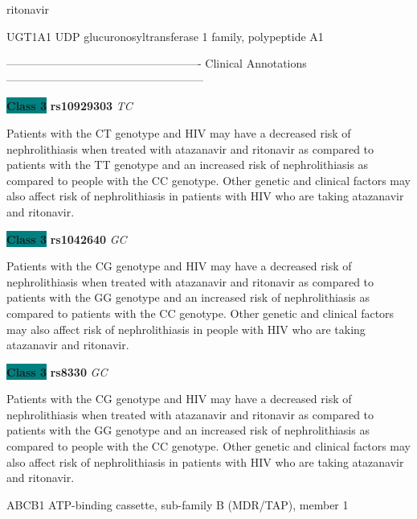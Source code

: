 \documentclass{resume} %
\begin{document}
\begin{rSection}{ ritonavir }
\begin{rSubsection}{ UGT1A1 }{ UDP glucuronosyltransferase 1 family, polypeptide A1 }{}{}
\item[] ---------------------------------------------------- Clinical Annotations -----------------------------------------------------\newline
\item \textbf{\colorbox{teal} {Class 3}} \textbf{ rs10929303 } \textit{ TC }
\item[] Patients with the CT genotype and HIV may have a decreased risk of nephrolithiasis when treated with atazanavir and ritonavir as compared to patients with the TT genotype and an increased risk of nephrolithiasis as compared to people with the CC genotype. Other genetic and clinical factors may also affect risk of nephrolithiasis in patients with HIV who are taking atazanavir and ritonavir. \item \textbf{\colorbox{teal} {Class 3}} \textbf{ rs1042640 } \textit{ GC }
\item[] Patients with the CG genotype and HIV may have a decreased risk of nephrolithiasis when treated with atazanavir and ritonavir as compared to patients with the GG genotype and an increased risk of nephrolithiasis as compared to patients with the CC genotype. Other genetic and clinical factors may also affect risk of nephrolithiasis in people with HIV who are taking atazanavir and ritonavir.\item \textbf{\colorbox{teal} {Class 3}} \textbf{ rs8330 } \textit{ GC }
\item[] Patients with the CG genotype and HIV may have a decreased risk of nephrolithiasis when treated with atazanavir and ritonavir as compared to patients with the GG genotype and an increased risk of nephrolithiasis as compared to people with the CC genotype. Other genetic and clinical factors may also affect risk of nephrolithiasis in patients with HIV who are taking atazanavir and ritonavir.
\end{rSubsection}\begin{rSubsection}{ ABCB1 }{ ATP-binding cassette, sub-family B (MDR/TAP), member 1 }{}{}
\item[]


\end{rSubsection}
\end{rSection}
\end{document}
